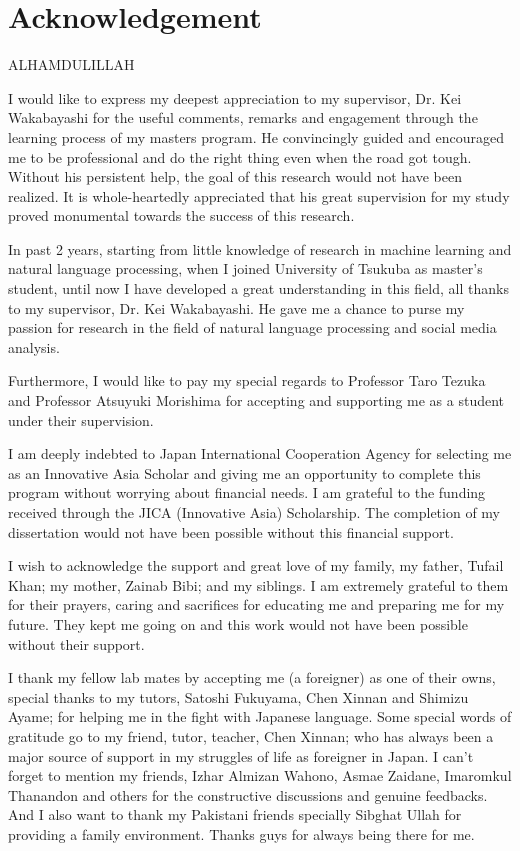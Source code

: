 \documentclass[a4paper]{report}
\begin{document}

\chapter*{Acknowledgement}
ALHAMDULILLAH

I would like to express my deepest appreciation to my supervisor, Dr. Kei Wakabayashi for the useful comments, remarks and engagement through the learning process of my masters program. 
He convincingly guided and encouraged me to be professional and do the right thing even when the road got tough. 
Without his persistent help, the goal of this research would not have been realized.
It is whole-heartedly appreciated that his great supervision for my study proved monumental towards the success of this research.

In past 2 years, starting from little knowledge of research in machine learning and natural language processing, when I joined University of Tsukuba as master's student, until now I have developed a great understanding in this field, all thanks to my supervisor, Dr. Kei Wakabayashi. He gave me a chance to purse my passion for research in the field of natural language processing and social media analysis. 

Furthermore, I would like to pay my special regards to Professor Taro Tezuka and Professor Atsuyuki Morishima for accepting and supporting me as a student under their supervision. 

I am deeply indebted to Japan International Cooperation Agency for selecting me as an Innovative Asia Scholar and giving me an opportunity to complete this program without worrying about financial needs. I am grateful to the funding received through the JICA (Innovative Asia) Scholarship. The completion of my dissertation would not have been possible without this financial support.

I wish to acknowledge the support and great love of my family, my father, Tufail Khan; my mother, Zainab Bibi; and my siblings. I am extremely grateful to them for their prayers, caring and sacrifices for educating me and preparing me for my future. They kept me going on and this work would not have been possible without their support.

I thank my fellow lab mates by accepting me (a foreigner) as one of their owns, special thanks to my tutors, Satoshi Fukuyama, Chen Xinnan and Shimizu Ayame; for helping me in the fight with Japanese language. Some special words of gratitude go to my friend, tutor, teacher, Chen Xinnan; who has always been a major source of support in my struggles of life as foreigner in Japan. 
I can't forget to mention my friends, Izhar Almizan Wahono, Asmae Zaidane, Imaromkul Thanandon and others for the constructive discussions and genuine feedbacks. And I also want to thank my Pakistani friends specially Sibghat Ullah for providing a family environment. Thanks guys for always
being there for me. 
\end{document}
